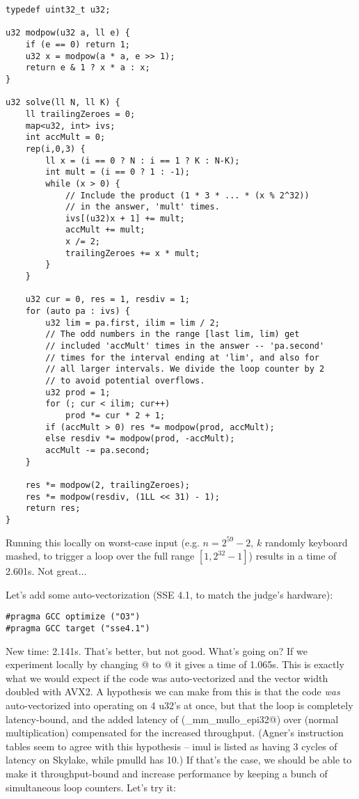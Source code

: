 \begin{lstlisting}
typedef uint32_t u32;

u32 modpow(u32 a, ll e) {
	if (e == 0) return 1;
	u32 x = modpow(a * a, e >> 1);
	return e & 1 ? x * a : x;
}

u32 solve(ll N, ll K) {
	ll trailingZeroes = 0;
	map<u32, int> ivs;
	int accMult = 0;
	rep(i,0,3) {
		ll x = (i == 0 ? N : i == 1 ? K : N-K);
		int mult = (i == 0 ? 1 : -1);
		while (x > 0) {
			// Include the product (1 * 3 * ... * (x % 2^32))
			// in the answer, 'mult' times.
			ivs[(u32)x + 1] += mult;
			accMult += mult;
			x /= 2;
			trailingZeroes += x * mult;
		}
	}

	u32 cur = 0, res = 1, resdiv = 1;
	for (auto pa : ivs) {
		u32 lim = pa.first, ilim = lim / 2;
		// The odd numbers in the range [last lim, lim) get
		// included 'accMult' times in the answer -- 'pa.second'
		// times for the interval ending at 'lim', and also for
		// all larger intervals. We divide the loop counter by 2
		// to avoid potential overflows.
		u32 prod = 1;
		for (; cur < ilim; cur++)
			prod *= cur * 2 + 1;
		if (accMult > 0) res *= modpow(prod, accMult);
		else resdiv *= modpow(prod, -accMult);
		accMult -= pa.second;
	}

	res *= modpow(2, trailingZeroes);
	res *= modpow(resdiv, (1LL << 31) - 1);
	return res;
}
\end{lstlisting}

Running this locally on worst-case input (e.g. $n = 2^{59}-2$, $k$ randomly keyboard mashed, to trigger a loop over the full range $[1, 2^{32}-1]$) results in a time of 2.601s. Not great...

Let's add some auto-vectorization (SSE 4.1, to match the judge's hardware):
\begin{lstlisting}
#pragma GCC optimize ("O3")
#pragma GCC target ("sse4.1")
\end{lstlisting}

New time: 2.141s. That's better, but not good. What's going on?
If we experiment locally by changing @ to @ it gives a time of 1.065s.
This is exactly what we would expect if the code was auto-vectorized and the vector width doubled with AVX2.
A hypothesis we can make from this is that the code \emph{was} auto-vectorized into operating on 4 u32's at once, but that the loop is completely latency-bound, and the added latency of \verb@pmulld@ (\verb@_mm_mullo_epi32@) over \verb@imul@ (normal multiplication) compensated for the increased throughput.
(Agner's instruction tables seem to agree with this hypothesis -- imul is listed as having 3 cycles of latency on Skylake, while pmulld has 10.)
If that's the case, we should be able to make it throughput-bound and increase performance by keeping a bunch of simultaneous loop counters.
Let's try it:

